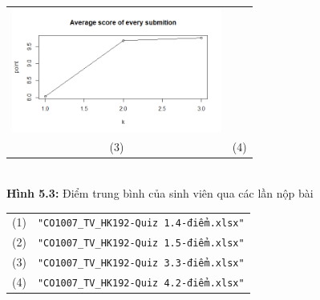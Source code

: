 \documentclass[a4paper]{article}
\theoremstyle{definition}
\begin{document}
\begin{enumerate}[a)]
\begin{itemize}
\begin{center}
\begin{tabular}{c c}
                 \includegraphics[width = 6.9cm]{Images/img5-3-4.png} \\
                 (3) & (4)
            \end{tabular}\\
            \textbf{Hình 5.3:}  Điểm trung bình của sinh viên qua các lần nộp bài\\
            \begin{tabular}{c c}
                 (1) & \texttt{"CO1007\_TV\_HK192-Quiz 1.4-điểm.xlsx"}\\
                 (2) & \texttt{"CO1007\_TV\_HK192-Quiz 1.5-điểm.xlsx"}\\
                 (3) & \texttt{"CO1007\_TV\_HK192-Quiz 3.3-điểm.xlsx"}\\
                 (4) & \texttt{"CO1007\_TV\_HK192-Quiz 4.2-điểm.xlsx"}
            \end{tabular}
        \end{center}
        

\end{itemize}
\end{enumerate}
\end{document}
